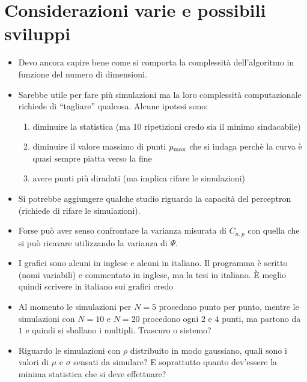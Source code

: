 \documentclass[a4paper,12pt,twoside,openright]{report}
\begin{document}
\section{Considerazioni varie e possibili sviluppi}
\begin{itemize}
	\item Devo ancora capire bene come si comporta la complessità dell'algoritmo in funzione del numero di dimensioni.
	\item Sarebbe utile per fare più simulazioni ma la loro complessità computazionale richiede di ``tagliare'' qualcosa. Alcune ipotesi sono:
	\begin{enumerate}
		\item diminuire la statistica (ma 10 ripetizioni credo sia il minimo sindacabile)
		\item diminuire il valore massimo di punti $p_\textup{max}$ che si indaga perchè la curva è quasi sempre piatta verso la fine
		\item avere punti più diradati (ma implica rifare le simulazioni)
	\end{enumerate}
	\item Si potrebbe aggiungere qualche studio riguardo la capacità del perceptron (richiede di rifare le simulazioni).
	\item Forse può aver senso confrontare la varianza misurata di $C_{n,p}$ con quella che si può ricavare utilizzando la varianza di $\Psi$.
	\item I grafici sono alcuni in inglese e alcuni in italiano. Il programma è scritto (nomi variabili) e commentato in inglese, ma la tesi in italiano. È meglio quindi scrivere in italiano sui grafici credo
	\item Al momento le simulazioni per $N=5$ procedono punto per punto, mentre le simulazioni con $N=10$ e $N=20$ procedono ogni $2$ e $4$ punti, ma partono da $1$ e quindi si sballano i multipli. Trascuro o sistemo?
	\item Riguardo le simulazioni con $\rho$ distribuito in modo gaussiano, quali sono i valori di $\mu$ e $\sigma$ sensati da simulare? E soprattutto quanto dev'essere la minima statistica che si deve effettuare?
\end{itemize}
\end{document}
